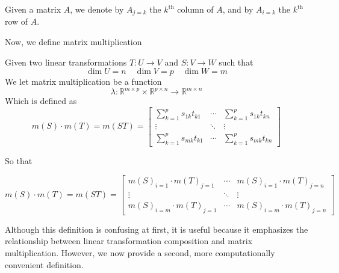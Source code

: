 \documentclass[../linear-spaces.tex]{subfiles}
\begin{document}
\begin{definition}
    Given a matrix $A$, we denote by $A_{j=k}$ the $k^{\text{th}}$ column of $A$, and by $A_{i=k}$ the $k^{\text{th}}$ row of $A$.
\end{definition}

Now, we define matrix multiplication

\begin{definition}
    Given two linear transformations $T: U \to V$ and $S: V \to W$ such that
    \begin{equation*}
        \dim U = n\quad\dim V = p\quad\dim W = m
    \end{equation*}
    We let matrix multiplication be a function
    \begin{equation*}
        \lambda: \mathbb{R}^{m \times p} \times \mathbb{R}^{p \times n} \to \mathbb{R}^{m \times n}    \end{equation*}
    Which is defined as
    \begin{equation*}
        m(S) \cdot m(T) = m(ST) = \left[\begin{matrix}
                \sum_{k=1}^{p}{s_{1k} t_{k1}} & \cdots & \sum_{k=1}^{p}{s_{1k} t_{kn}} \\
                \vdots                        & \ddots & \vdots                        \\
                \sum_{k=1}^{p}{s_{mk} t_{k1}} & \cdots & \sum_{k=1}^{p}{s_{mk} t_{kn}}
            \end{matrix}\right]
    \end{equation*}

    So that

    \begin{equation*}
        m(S) \cdot m(T) = m(ST) = \left[\begin{matrix}
                m(S)_{i=1}\cdot m(T)_{j=1} & \cdots & m(S)_{i=1}\cdot m(T)_{j=n} \\
                \vdots                     & \ddots & \vdots                     \\
                m(S)_{i=m}\cdot m(T)_{j=1} & \cdots & m(S)_{i=m}\cdot m(T)_{j=n}
            \end{matrix}\right]
    \end{equation*}
\end{definition}

Although this definition is confusing at first, it is useful because it
emphasizes the relationship between linear transformation composition and
matrix multiplication. However, we now provide a second, more computationally
convenient definition.
\end{document}
